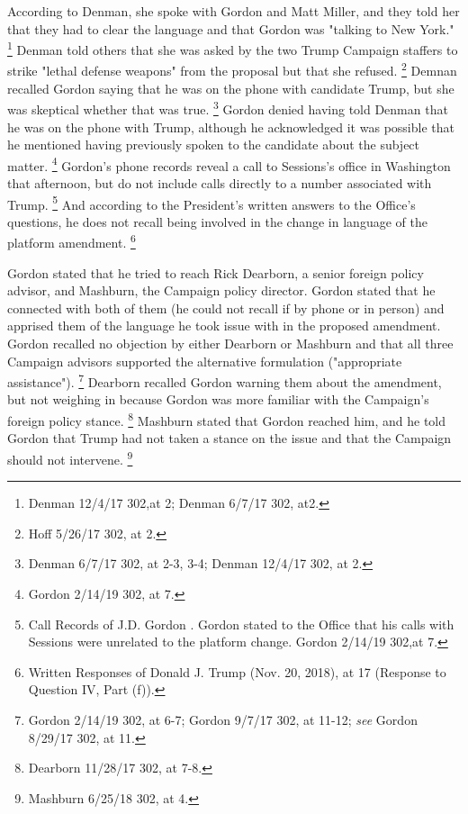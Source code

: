 According to Denman, she spoke with Gordon and Matt Miller, and they told her that they had to clear the language and that Gordon was "talking to New York."%
\footnote{Denman 12/4/17 302,at 2;
Denman 6/7/17 302, at2.}
Denman told others that she was asked by the two Trump Campaign staffers to strike "lethal defense weapons" from the proposal but that she refused.%
\footnote{Hoff 5/26/17 302, at 2.}
Demnan recalled Gordon saying that he was on the phone with candidate Trump, but she was skeptical whether that was true.%
\footnote{Denman 6/7/17 302, at 2-3, 3-4;
Denman 12/4/17 302, at 2.}
Gordon denied having told Denman that he was on the phone with Trump, although he acknowledged it was possible that he mentioned having previously spoken to the candidate about the subject matter.%
\footnote{Gordon 2/14/19 302, at 7.}
Gordon's phone records reveal a call to Sessions's office in Washington that afternoon, but do not include calls directly to a number associated with Trump.%
\footnote{Call Records of J.D. Gordon .
Gordon stated to the Office that his calls with Sessions were unrelated to the platform change. Gordon 2/14/19 302,at 7.}
And according to the President's written answers to the Office's questions, he does not recall being involved in the change in language of the platform amendment.%
\footnote{Written Responses of Donald J. Trump (Nov. 20, 2018), at 17 (Response to Question IV, Part (f)).}

Gordon stated that he tried to reach Rick Dearborn, a senior foreign policy advisor, and Mashburn, the Campaign policy director.
Gordon stated that he connected with both of them (he could not recall if by phone or in person) and apprised them of the language he took issue with in the proposed amendment.
Gordon recalled no objection by either Dearborn or Mashburn and that all three Campaign advisors supported the alternative formulation ("appropriate assistance").%
\footnote{Gordon 2/14/19 302, at 6-7;
Gordon 9/7/17 302, at 11-12;
\textit{see} Gordon 8/29/17 302, at 11.}
Dearborn recalled Gordon warning them about the amendment, but not weighing in because Gordon was more familiar with the Campaign's foreign policy stance.%
\footnote{Dearborn 11/28/17 302, at 7-8.}
Mashburn stated that Gordon reached him, and he told Gordon that Trump had not taken a stance on the issue and that the Campaign should not intervene.%
\footnote{Mashburn 6/25/18 302, at 4.}

